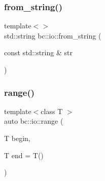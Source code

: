 \mbox{\label{namespacebc_1_1io_a6c9aff1cd2a85a667f45c7bbaac41848}} 
\subsubsection{\texorpdfstring{from\+\_\+string()}{from\_string()}\hspace{0.1cm}{\footnotesize\ttfamily [4/4]}}
{\footnotesize\ttfamily template$<$$>$ \\
std\+::string bc\+::io\+::from\+\_\+string (\begin{DoxyParamCaption}\item[{const std\+::string \&}]{str }\end{DoxyParamCaption})\hspace{0.3cm}{\ttfamily [inline]}}

\mbox{\label{namespacebc_1_1io_a9665fd460e884af7baac638c11a92111}} 
\subsubsection{\texorpdfstring{range()}{range()}}
{\footnotesize\ttfamily template$<$class T $>$ \\
auto bc\+::io\+::range (\begin{DoxyParamCaption}\item[{T}]{begin,  }\item[{T}]{end = {\ttfamily T()} }\end{DoxyParamCaption})}

